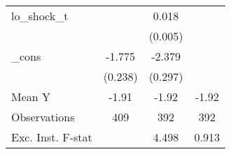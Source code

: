 {\begin{tabular}{l*{3}{c}}
\addlinespace
lo\_shock\_t  &                     &       0.018\sym{***}&                     \\
            &                     &     (0.005)         &                     \\
\addlinespace
\_cons      &      -1.775\sym{***}&      -2.379\sym{***}&                     \\
            &     (0.238)         &     (0.297)         &                     \\
\midrule
Mean Y      &       -1.91         &       -1.92         &       -1.92         \\
Observations&         409         &         392         &         392         \\
Exc. Inst. F-stat&                     &       4.498         &       0.913         \\
\bottomrule
\end{tabular}
}
